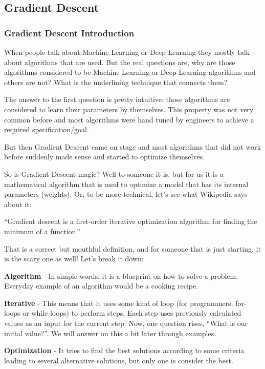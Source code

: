 \documentclass[]{book}
\begin{document}
\newpage

\subsection{Gradient Descent}

\subsubsection{Gradient Descent Introduction}

When people talk about Machine Learning or Deep Learning they mostly talk about algorithms that are used. But the real questions are, why are those algorithms considered to be Machine Learning or Deep Learning algorithms and others are not? What is the underlining technique that connects them?

The answer to the first question is pretty intuitive: those algorithms are considered to learn their parameters by themselves. This property was not very common before and most algorithms were hand tuned by engineers to achieve a required specification/goal.

But then Gradient Descent came on stage and most algorithms that did not work before suddenly made sense and started to optimize themselves.

So is Gradient Descent magic? Well to someone it is, but for us it is a mathematical algorithm that is used to optimize a model that has its internal parameters (weights). Or, to be more technical, let's see what Wikipedia says about it:

\begin{center}
    “Gradient descent is a first-order iterative optimization algorithm for finding the minimum of a function.”
\end{center}

That is a correct but mouthful definition, and for someone that is just starting, it is the scary one as well! Let's break it down:

\textbf{Algorithm} - In simple words, it is a blueprint on how to solve a problem. Everyday example of an algorithm would be a cooking recipe.

\textbf{Iterative} - This means that it uses some kind of loop (for programmers, for-loops or while-loops) to perform steps. Each step uses previously calculated values as an input for the current step. Now, one question rises, ``What is our initial value?''. We will answer on this a bit later through examples.

\textbf{Optimization} - It tries to find the best solutions according to some criteria leading to several alternative solutions, but only one is consider the best.
\end{document}
